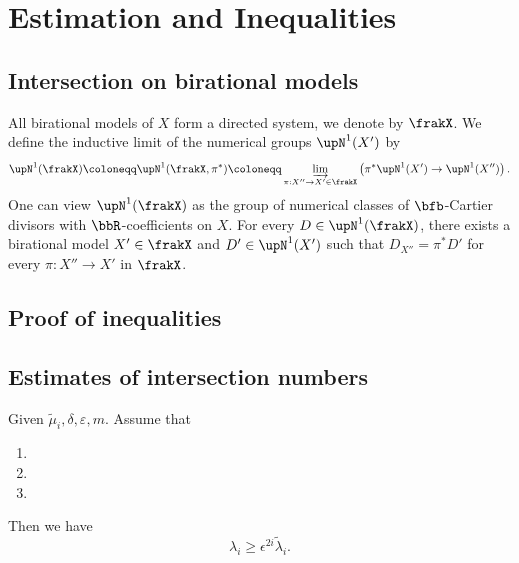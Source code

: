 \section{Estimation and Inequalities}


\subsection{Intersection on birational models}

  All birational models of $X$ form a directed system, we denote by $\frakX$.
  We define the inductive limit of the numerical groups $\upN^1(X')$ by 
  \[ \upN^1(\frakX) \coloneqq \upN^1(\frakX,\pi^*) \coloneqq \varinjlim_{\pi:X'' \to X' \in \frakX} \left( \pi^* \upN^1(X') \to \upN^1(X'') \right). \]
  One can view $\upN^1(\frakX)$ as the group of numerical classes of $\bfb$-Cartier divisors with $\bbR$-coefficients on $X$.
  For every $D \in \upN^1(\frakX)$, there exists a birational model $X' \in \frakX$ and $D' \in \upN^1(X')$ such that $D_{X''} = \pi^* D'$ for every $\pi: X'' \to X'$ in $\frakX$.
  




\subsection{Proof of inequalities}





\subsection{Estimates of intersection numbers}

  \begin{theorem}
    Given $\widetilde{\mu}_i, \delta, \varepsilon, m$.
    Assume that \Yang{}
    \begin{enumerate}
      \item 
      \item 
      \item \Yang{}
    \end{enumerate}
    Then we have 
    \[ \lambda_i \geq \epsilon^{2i} \widetilde{\lambda}_i. \]
  \end{theorem}


  \Yang{}

